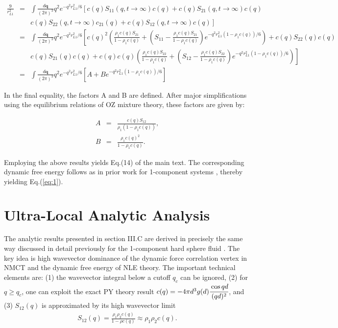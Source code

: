 \documentclass[twocolumn,showpacs,preprintnumbers,amsmath,amssymb,unsortedaddress,
]{revtex4-1}
\begin{document}
\begin{widetext}
\begin{eqnarray}
\frac{9}{r^2_{L1}}&=& \int \frac{d\mathbf{q}}{(2\pi)^3}q^2e^{-q^2r_{L1}^2/6}\left[c(q)S_{11}(q,t\rightarrow \infty)c(q) + c(q)S_{21}(q,t\rightarrow \infty)c(q) \right.\nonumber\\
& &\left.  c(q)S_{22}(q,t\rightarrow \infty)c_{21}(q) + c(q)S_{12}(q,t\rightarrow \infty)c(q)\right]\nonumber\\
&=& \int \frac{d\mathbf{q}}{(2\pi)^3}q^2e^{-q^2r_{L1}^2/6}\left[c(q)^2\left(\frac{\rho_1c(q)S_{21}}{1-\rho_1c(q)} + \left(S_{11}-\frac{\rho_1c(q)S_{21}}{1-\rho_1c(q)} \right)e^{-q^2r_{L1}^2(1-\rho_1c(q))/6} \right) + c(q)S_{22}(q)c(q) \right.\nonumber\\
& & \left.  c(q)S_{21}(q)c(q) + c(q)c(q)\left(\frac{\rho_1c(q)S_{22}}{1-\rho_1c(q)} + \left(S_{12}-\frac{\rho_1c(q)S_{22}}{1-\rho_1c(q)} \right)e^{-q^2r_{L1}^2(1-\rho_1c(q))/6} \right) \right]\nonumber\\
&=& \int \frac{d\mathbf{q}}{(2\pi)^3}q^2e^{-q^2r_{L1}^2/6}\left[A+Be^{-q^2r_{L1}^2(1-\rho_1c(q))/6} \right]
\label{eq:appendix1}
\end{eqnarray}
\end{widetext}
In the final equality, the factors A and B are defined. After major simplifications using the equilibrium relations of OZ mixture theory, these factors are given by:

\begin{eqnarray}
A &=&  \frac{c(q)S_{12}}{\rho_1\left(1-\rho_1c(q) \right)}, \nonumber\\
B &=& \frac{\rho_1c(q)^2}{1-\rho_1c(q)}.
\end{eqnarray}

Employing the above results yields Eq.(14) of the main text. The corresponding dynamic free energy follows as in prior work for 1-component systems \cite{7,10}, thereby yielding Eq.(\ref{eq:1}).

\section{Ultra-Local Analytic Analysis}
The analytic results presented in section III.C are derived in precisely the same way discussed in detail previously for the 1-component hard sphere fluid \cite{45}. The key idea is high wavevector dominance of the dynamic force correlation vertex in NMCT and the dynamic free energy of NLE theory. The important technical elements are: (1) the wavevector integral below a cutoff $q_c$ can be ignored, (2) for $q \geq q_c$, one can exploit the exact PY theory result \cite{45,49} $c(q) = -4\pi d^3g(d)\cfrac{\cos qd}{(qd)^2}$, and (3) $S_{12}(q)$ is approximated by its high wavevector limit
\begin{eqnarray}
S_{12}(q) = \frac{\rho_1\rho_2 c(q)}{1-\rho c(q)}\approx \rho_1\rho_2c(q).
\label{eq:appendix2}
\end{eqnarray}
\end{document}
